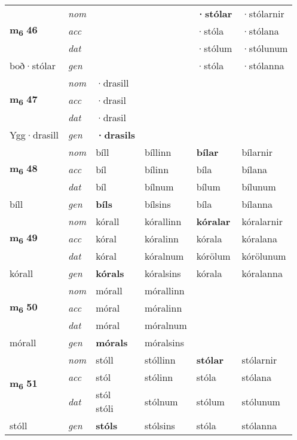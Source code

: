 \begin{longtable}[l]{X>{\footnotesize\itshape}XXXXX}
\multirow{3}{*}{{{\textbf{m{\textsubscript{6}}} \Large{\textbf{46}}}}} & nom &  &  & \textbf{·stólar} & ·stólarnir \\*
 & acc &  &  & ·stóla & ·stólana \\*
 & dat &  &  & ·stólum & ·stólunum \\*
 {\footnotesize{boð\allowbreak ·stólar}} & gen & \textbf{} &  & ·stóla & ·stólanna \\
\midrule

\multirow{3}{*}{{{\textbf{m{\textsubscript{6}}} \Large{\textbf{47}}}}} & nom & ·drasill &  & \textbf{} &  \\*
 & acc & ·drasil &  &  &  \\*
 & dat & ·drasil &  &  &  \\*
 {\footnotesize{Ygg\allowbreak ·drasill}} & gen & \textbf{·drasils} &  &  &  \\
\midrule

\multirow{3}{*}{{{\textbf{m{\textsubscript{6}}} \Large{\textbf{48}}}}} & nom & bíll & bíllinn & \textbf{bílar} & bílarnir \\*
 & acc & bíl & bílinn & bíla & bílana \\*
 & dat & bíl & bílnum & bílum & bílunum \\*
 {\footnotesize{bíll}} & gen & \textbf{bíls} & bílsins & bíla & bílanna \\
\midrule

\multirow{3}{*}{{{\textbf{m{\textsubscript{6}}} \Large{\textbf{49}}}}} & nom & kórall & kórallinn & \textbf{kóralar} & kóralarnir \\*
 & acc & kóral & kóralinn & kórala & kóralana \\*
 & dat & kóral & kóralnum & kórölum & kórölunum \\*
 {\footnotesize{kórall}} & gen & \textbf{kórals} & kóralsins & kórala & kóralanna \\
\midrule

\multirow{3}{*}{{{\textbf{m{\textsubscript{6}}} \Large{\textbf{50}}}}} & nom & mórall & mórallinn & \textbf{} &  \\*
 & acc & móral & móralinn &  &  \\*
 & dat & móral & móralnum &  &  \\*
 {\footnotesize{mórall}} & gen & \textbf{mórals} & móralsins &  &  \\
\midrule

\multirow{3}{*}{{{\textbf{m{\textsubscript{6}}} \Large{\textbf{51}}}}} & nom & stóll & stóllinn & \textbf{stólar} & stólarnir \\*
 & acc & stól & stólinn & stóla & stólana \\*
 & dat & \specialcell{stól\\ stóli} & stólnum & stólum & stólunum \\*
 {\footnotesize{stóll}} & gen & \textbf{stóls} & stólsins & stóla & stólanna \\
\midrule


\end{longtable}
